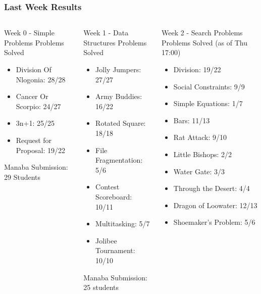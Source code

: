 \documentclass{beamer}
\begin{document}
\begin{frame}
  \frametitle{Last Week Results}
  {\tiny
    \begin{columns}[T]
      \begin{block}{Week 0 - Simple Problems}
        Problems Solved\\
        \begin{itemize}
        \item Division Of Nlogonia: 28/28
        \item Cancer Or Scorpio: 24/27
        \item 3n+1: 25/25
        \item Request for Proposal: 19/22
        \end{itemize}

        \medskip

        Manaba Submission: 29 Students
      \end{block}
      \begin{block}{Week 1 - Data Structures}
        Problems Solved\\
        \begin{itemize}
          \item Jolly Jumpers: 27/27
          \item Army Buddies: 16/22
          \item Rotated Square: 18/18
          \item File Fragmentation: 5/6
          \item Contest Scoreboard: 10/11
          \item Multitasking: 5/7
          \item Jolibee Tournament: 10/10
        \end{itemize}

        \medskip

        Manaba Submission: 25 students
      \end{block}
      \begin{block}{Week 2 - Search Problems}
        Problems Solved (as of Thu 17:00)\\
        \begin{itemize}
        \item Division: 19/22
        \item Social Constraints: 9/9
        \item Simple Equations: 1/7
        \item Bars: 11/13
        \item Rat Attack: 9/10
        \item Little Bishops: 2/2
        \item Water Gate: 3/3
        \item Through the Desert: 4/4
        \item Dragon of Loowater: 12/13
        \item Shoemaker's Problem: 5/6
        \end{itemize}
      \end{block}
    \end{columns}
  }


\end{frame}
\end{document}
